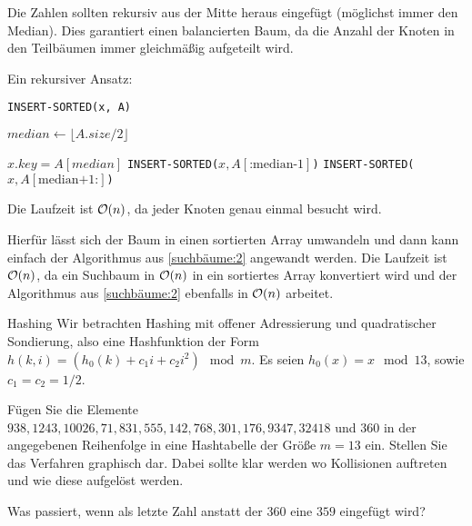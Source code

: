\documentclass{article}
\begin{document}
\begin{solutions}
  \item Die Zahlen sollten rekursiv aus der Mitte heraus eingefügt (möglichst immer den Median). Dies garantiert einen balancierten Baum, da die Anzahl der Knoten in den Teilbäumen immer gleichmäßig aufgeteilt wird.
  \item Ein rekursiver Ansatz:
  \begin{algorithm}[ht]
    \caption{\texttt{INSERT-SORTED(x, A)}}
    \BlankLine

    $median \gets \lfloor A.size/2 \rfloor$\;


    $x.key = A[median]$\;
    \texttt{INSERT-SORTED($x, A[\text{:median-1}]$)}\;
    \texttt{INSERT-SORTED($x, A[\text{median+1:}]$)}
  \end{algorithm}
  Die Laufzeit ist $\mathcal{O}(n)$, da jeder Knoten genau einmal besucht wird.
  \item Hierfür lässt sich der Baum in einen sortierten Array umwandeln und dann kann einfach der Algorithmus aus \ref{suchbäume:2} angewandt werden. Die Laufzeit ist $\mathcal{O}(n)$, da ein Suchbaum in $\mathcal{O}(n)$ in ein sortiertes Array konvertiert wird und der Algorithmus aus \ref{suchbäume:2} ebenfalls in $\mathcal{O}(n)$ arbeitet.
\end{solutions}

\begin{eexercises}{Hashing}{
    Wir betrachten Hashing mit offener Adressierung und quadratischer Sondierung, also eine Hashfunktion der Form $h(k, i) = (h_0(k) + c_1i + c_2i^2) \mod m$. Es seien $h_0(x) = x \mod 13$, sowie $c_1 = c_2 = 1/2$.
  }
  \item Fügen Sie die Elemente $938, 1243, 10026, 71, 831, 555, 142, 768, 301, 176, 9347, 32418$ und $360$ in der angegebenen Reihenfolge in eine Hashtabelle der Größe $m = 13$ ein. Stellen Sie das Verfahren graphisch dar. Dabei sollte klar werden wo Kollisionen auftreten und wie diese aufgelöst werden.
  \item Was passiert, wenn als letzte Zahl anstatt der $360$ eine $359$ eingefügt wird?
\end{eexercises}
\end{document}
